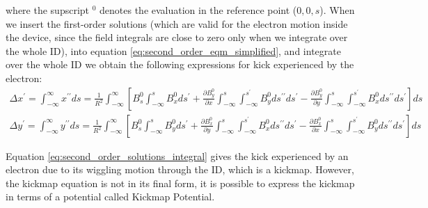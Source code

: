 \documentclass[a4paper,12pt]{article}
\begin{document}
where the supscript $^0$ denotes the evaluation in the reference point ($0, 0, s$). When we insert the first-order solutions (which
are valid for the electron motion inside the device, since the field integrals are close to zero only when we integrate over the whole ID), into 
equation \eqref{eq:second_order_eqm_simplified}, and integrate over the whole ID we obtain the following expressions for kick experienced by the
electron:
\begin{equation}
    \begin{aligned}
        \Delta x^{\prime} = \int_{-\infty}^{\infty}x^{\prime \prime}ds = \frac{1}{R^2}\int_{-\infty}^{\infty}\left[B_s^{0}\int_{-\infty}^{s}B_x^{0}ds^{\prime}
        +\frac{\partial B_y^0}{\partial x}\int_{-\infty}^{s}\int_{-\infty}^{s^{\prime}}B_y^{0}ds^{\prime \prime}ds^{\prime}
        -\frac{\partial B_y^0}{\partial y}\int_{-\infty}^{s}\int_{-\infty}^{s^{\prime}}B_x^{0}ds^{\prime \prime}ds^{\prime}\right]ds \\
        \Delta y^{\prime} = \int_{-\infty}^{\infty}y^{\prime \prime}ds = \frac{1}{R^2}\int_{-\infty}^{\infty}\left[B_s^{0}\int_{-\infty}^{s}B_y^{0}ds^{\prime}
        +\frac{\partial B_x^0}{\partial y}\int_{-\infty}^{s}\int_{-\infty}^{s^{\prime}}B_x^{0}ds^{\prime \prime}ds^{\prime}
        -\frac{\partial B_x^0}{\partial x}\int_{-\infty}^{s}\int_{-\infty}^{s^{\prime}}B_y^{0}ds^{\prime \prime}ds^{\prime}\right]ds
    \end{aligned}
   \label{eq:second_order_solutions_integral} 
\end{equation}

\par Equation \eqref{eq:second_order_solutions_integral} gives the kick experienced by an electron due to its wiggling motion through the ID,
which is a kickmap. However, the kickmap equation is not in its final form, it is possible to express the kickmap in terms
 of a potential called Kickmap Potential.

\end{document}
